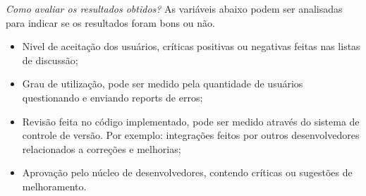 \textit{Como avaliar os resultados obtidos?} As variáveis abaixo podem ser analisadas para indicar se os resultados foram bons ou não.
\begin{itemize}
\item Nivel de aceitação dos usuários, críticas positivas ou negativas feitas nas listas de discussão;
\item Grau de utilização, pode ser medido pela quantidade de usuários questionando e enviando reports de erros;
\item Revisão feita no código implementado, pode ser medido através do sistema de controle de versão. Por exemplo: integrações feitos por outros desenvolvedores relacionados a correções e melhorias;
\item Aprovação pelo núcleo de desenvolvedores, contendo críticas ou sugestões de melhoramento.
\end{itemize}


